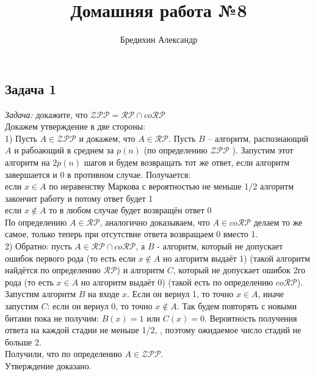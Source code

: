 \documentclass[a4paper,12pt]{article} %
\author{Бредихин Александр}
\title{Домашняя работа №8}
\begin{document}
\maketitle

\subsection*{Задача 1}
\textit{Задача:} докажите, что $\mathcal{ZPP} = \mathcal{RP} \cap co\mathcal{RP}$\smallskip \\

Докажем утверждение в две стороны:\\

1) Пусть $ A \in \mathcal{ZPP}$ и докажем, что $ A \in \mathcal{RP} $. Пусть $ B $ -- алгоритм, распознающий $ A $ и рабоающий в среднем за $ p(n) $ (по определению $ \mathcal{ZPP}$ ). Запустим этот алгоритм на $ 2p(n) $ шагов и будем возвращать тот же ответ, если алгоритм завершается и 0 в противном случае. Получается: \\
если $ x \in A$ по неравенству Маркова с вероятностью не меньше 1/2 алгоритм закончит работу и потому ответ будет 1\\
если $ x \notin A $ то в любом случае будет возвращён ответ 0\\

По определению $ A \in \mathcal{RP} $, аналогично доказываем, что $ A \in co\mathcal{RP} $ делаем то же самое, только теперь при отсутствие ответа возвращаем 0 вместо 1.\\

2) Обратно: пусть $ A \in \mathcal{RP} \cap co\mathcal{RP} $, а $ B $ - алгоритм, который не допускает ошибок первого рода (то есть если $ x \notin A $ но алгоритм выдаёт 1) (такой алгоритм найдётся по определению $ \mathcal{RP} $) и алгоритм $ C $, который не допускает ошибок 2го рода (то есть $ x \in A$ но алгоритм выдаёт 0) (такой есть по определению $co\mathcal{RP}$). \\
Запустим алгоритм $ B $ на входе $ x $. Если он вернул 1, то точно $ x \in A $, иначе запустим $ C $: если он вернул 0, то точно $ x \notin A $. Так будем повторять с новыми битами пока не получим: $ B(x) = 1 $ или $ C(x) = 0 $. Вероятность получения ответа на
каждой стадии не меньше 1/2, , поэтому ожидаемое число стадий не больше 2.\\
Получили, что по определению $ A \in \mathcal{ZPP} $.\\
Утверждение доказано.
\end{document}
